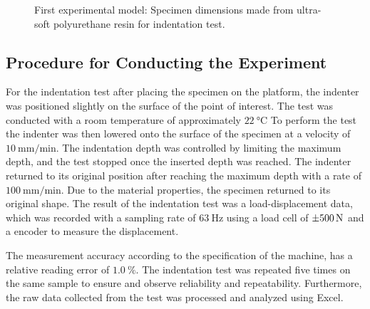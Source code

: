 \begin{figure}%
    \centering
   \qquad
   \caption{First experimental model: Specimen dimensions made from ultra-soft polyurethane resin for indentation test.}%
   \label{fig:specimenhole}%
\end{figure}

\subsection*{Procedure for Conducting the Experiment}
For the indentation test after placing the specimen on the platform,
the indenter was positioned slightly on the surface of the point of interest. 
The test was conducted with a room temperature of approximately $\SI{22}{\degreeCelsius}$
To perform the test the indenter was then lowered onto the surface of the specimen
at a velocity of $\SI[per-mode = symbol]{10}{\milli \m\per \minute}$.
The indentation depth was controlled by limiting the maximum depth, and the 
test stopped once the inserted depth was reached. The indenter returned to its 
original position after reaching the maximum depth with a rate of 
$\SI[per-mode = symbol]{100}{\milli \m\per \minute}$. Due to the material properties,
the specimen returned to its original shape.
The result of the indentation test was a load-displacement data,
which was recorded with a sampling rate of $\SI{63}{\hertz}$ using a load 
cell of $\SI{\pm 500}{\newton}$ and a encoder to measure the displacement.

The measurement accuracy according to the specification of the machine, has 
a relative reading error of $\SI{1.0}{\percent}$. The indentation test 
was repeated five times on the same sample to ensure and observe 
reliability and repeatability. Furthermore, the raw data collected from the test 
was processed and analyzed using Excel.\\

